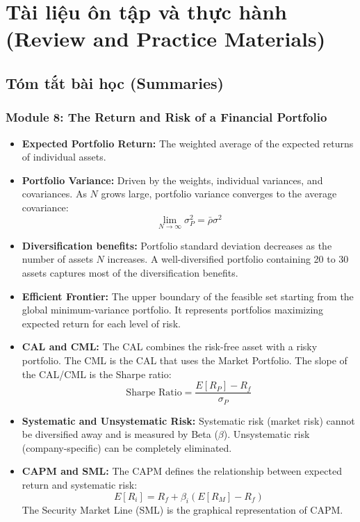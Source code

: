 \chapter{Tài liệu ôn tập và thực hành (Review and Practice Materials)}
\label{chap:Review and Practice Materials}

\section{Tóm tắt bài học (Summaries)}
\label{chap:Summaries of Modules}

\subsection{Module 8: The Return and Risk of a Financial Portfolio}
\label{sec:app_Summary_Module_8}

\begin{itemize}
	\item \textbf{Expected Portfolio Return:} The weighted average of the expected returns of individual assets.
	\item \textbf{Portfolio Variance:} Driven by the weights, individual variances, and covariances. As $N$ grows large, portfolio variance converges to the average covariance:
	      \[
	      \lim_{N \to \infty} \sigma_P^2 = \bar{\rho} \sigma^2
	      \]
	\item \textbf{Diversification benefits:} Portfolio standard deviation decreases as the number of assets $N$ increases. A well-diversified portfolio containing 20 to 30 assets captures most of the diversification benefits.
	\item \textbf{Efficient Frontier:} The upper boundary of the feasible set starting from the global minimum-variance portfolio. It represents portfolios maximizing expected return for each level of risk.
	\item \textbf{CAL and CML:} The CAL combines the risk-free asset with a risky portfolio. The CML is the CAL that uses the Market Portfolio. The slope of the CAL/CML is the Sharpe ratio:
	      \[
	      \text{Sharpe Ratio} = \frac{E[R_P] - R_f}{\sigma_P}
	      \]
	\item \textbf{Systematic and Unsystematic Risk:} Systematic risk (market risk) cannot be diversified away and is measured by Beta ($\beta$). Unsystematic risk (company-specific) can be completely eliminated.
	\item \textbf{CAPM and SML:} The CAPM defines the relationship between expected return and systematic risk:
	      \[
	      E[R_i] = R_f + \beta_i (E[R_M] - R_f)
	      \]
	      The Security Market Line (SML) is the graphical representation of CAPM.
\end{itemize}


